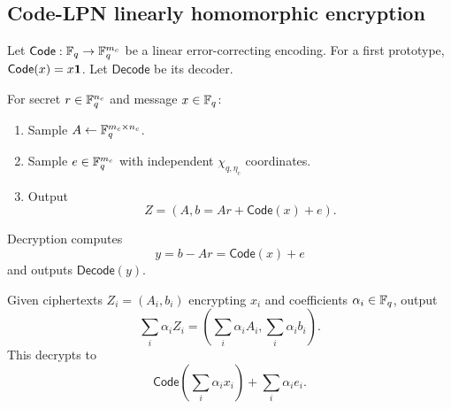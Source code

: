 \subsection{Code-LPN linearly homomorphic encryption}

Let $\mathsf{Code}:\mathbb{F}_q\to\mathbb{F}_q^{m_c}$ be a linear error-correcting encoding.  For a first prototype, $\mathsf{Code}(x)=x\mathbf{1}$.  Let $\mathsf{Decode}$ be its decoder.

\begin{construction}
\label{con:clpn}
For secret $r\in\mathbb{F}_q^{n_c}$ and message $x\in\mathbb{F}_q$:
\begin{enumerate}
    \item Sample $A\leftarrow\mathbb{F}_q^{m_c\times n_c}$.
    \item Sample $e\in\mathbb{F}_q^{m_c}$ with independent $\chi_{q,\eta_c}$ coordinates.
    \item Output
    \[
        Z=(A,b=Ar+\mathsf{Code}(x)+e).
    \]
\end{enumerate}
Decryption computes
\[
    y=b-Ar=\mathsf{Code}(x)+e
\]
and outputs $\mathsf{Decode}(y)$.
\end{construction}

\begin{construction}
Given ciphertexts $Z_i=(A_i,b_i)$ encrypting $x_i$ and coefficients $\alpha_i\in\mathbb{F}_q$, output
\[
    \sum_i \alpha_i Z_i
    =\left(\sum_i\alpha_iA_i,\sum_i\alpha_i b_i\right).
\]
This decrypts to
\[
    \mathsf{Code}\left(\sum_i\alpha_ix_i\right)+\sum_i\alpha_ie_i.
\]
\end{construction}

